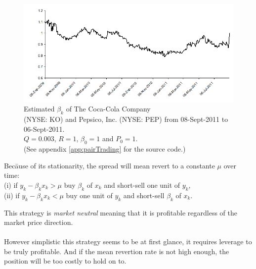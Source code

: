 \documentclass{article}
\theoremstyle{definition}
\theoremstyle{remark}
\begin{document}
\begin{figure}[h!]
	\centering
	\includegraphics[width=.9\textwidth]{beta.png}
	\caption{Estimated $\beta_k$ of The Coca-Cola Company \\(NYSE: KO) and Pepsico, Inc. (NYSE: PEP) from 08-Sept-2011 to 06-Sept-2011. \\$Q=0.003$, $R=1$, $\beta_0=1$ and $P_0=1$.\\(See appendix \ref{app:pairTrading} for the source code.)}
\end{figure}




\begin{tabbing}Bec\=ause of its stationarity, the spread will mean revert to a constante $\mu$ over time:\\
\> (i) if $y_k-\beta_k x_k>\mu$ buy $\beta_k$ of $x_k$ and short-sell one unit of $y_k$,\\
\>(ii) if $y_k-\beta_k x_k<\mu$ buy one unit of $y_k$ and short-sell $\beta_k$ of $x_k$.\\
\end{tabbing}

This strategy is \emph{market neutral} meaning that it is profitable regardless of the market price direction. \\
\\
However simplistic this strategy seems to be at first glance, it requires leverage to be truly profitable. And if the mean revertion rate is not high enough, the position will be too costly to hold on to.
\\







\end{document}
